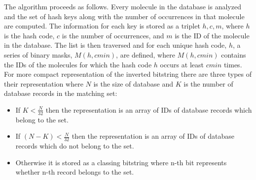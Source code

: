 The algorithm proceeds as follows. Every molecule in the database is analyzed and the set of hash keys along with the number of occurrences in that molecule are computed. The information for each key is stored as a triplet $ {h,c,m} $, where $ h $ is the hash code, $ c $ is the number of occurrences, and $ m $ is the ID of the molecule in the database. The list is then traversed and for each unique hash code, $ h $, a series of binary masks, $ M(h,cmin) $, are defined, where $ M(h,cmin) $ contains the IDs of the molecules for which the hash code $ h $ occurs at least $ cmin $ times.\\

For more compact representation of the inverted bitstring there are three types of their representation where $ N $ is the size of database and $ K $ is the number of database records in the matching set:

\begin{itemize}
	\item If $ K < \frac{N}{32} $ then the representation is an array of IDs of database records which belong to the set.
	\item If $ (N - K) < \frac{N}{32} $ then the representation is an array of IDs of database records which do not belong to the set.
	\item Otherwise it is stored as a classing bitstring where n-th bit represents whether n-th record belongs to the set.
	
\end{itemize}


















